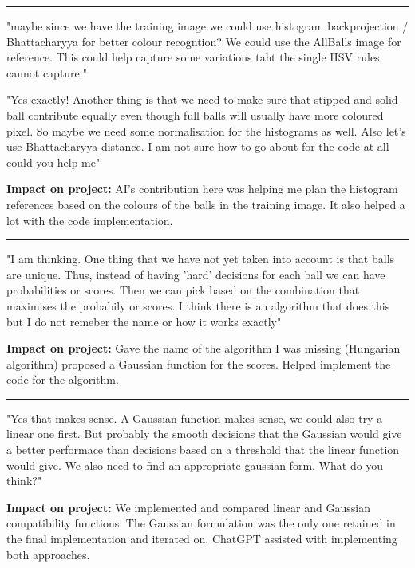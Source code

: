 \documentclass[12pt,a4paper]{article}
\newenvironment{promptentry}{%
    \par\Needspace{7\baselineskip}\addvspace{1.2em}
    \hrule
    \nobreak\vspace{0.5em}
}{\par\addvspace{0.5em}}
\newenvironment{aiprompt}{%
    \begin{list}{}{%
        \setlength{\leftmargin}{1em}%
        \setlength{\rightmargin}{1em}%
        \setlength{\topsep}{0.3em}%
        \setlength{\parsep}{0pt}%
    }%
    \item\relax
}{\end{list}}
\begin{document}
\begin{promptentry}

\begin{aiprompt}
"maybe since we have the training image we could use histogram backprojection / Bhattacharyya for better 
colour recogntion? We could use the AllBalls image for reference.
This could help capture some variations taht the single HSV rules cannot capture."
\end{aiprompt}

\begin{aiprompt}
"Yes exactly! Another thing is that we need to make sure that stipped and solid ball contribute equally even
though full balls will usually have more coloured pixel. So maybe we need some normalisation for the histograms as well.
Also let's use Bhattacharyya distance. I am not sure how to go about for the code at all
could you help me"
\end{aiprompt}

\textbf{Impact on project:} AI's contribution here was helping me plan 
the histogram references based on the colours of the balls in the training image. 
It also helped a lot with the code implementation.

\end{promptentry}
\FloatBarrier

\begin{promptentry}

\begin{aiprompt}
"I am thinking. One thing that we have not yet taken into account is that balls are unique. 
Thus, instead of having 'hard' decisions for each ball we can have probabilities or scores.
Then we can pick based on the combination that maximises the probabily or scores.
I think there is an algorithm that does this but I do not remeber the name or how it works 
exactly"
\end{aiprompt}

\textbf{Impact on project:} Gave the name of the algorithm I was missing (Hungarian algorithm)
proposed a Gaussian function for the scores. Helped implement the code for the algorithm.

\end{promptentry}
\FloatBarrier

\begin{promptentry}

\begin{aiprompt}
"Yes that makes sense. A Gaussian function makes sense, we could also try a linear one first. 
But probably the smooth decisions that the Gaussian would give a better performace than decisions 
based on a threshold that the linear function would give. We also need to find an appropriate gaussian form. 
What do you think?"
\end{aiprompt}

\textbf{Impact on project:} We implemented and compared linear and Gaussian compatibility 
functions. The Gaussian formulation was the only one retained in the final implementation 
and iterated on. ChatGPT assisted with implementing both approaches.

\end{promptentry}
\FloatBarrier
\end{document}
